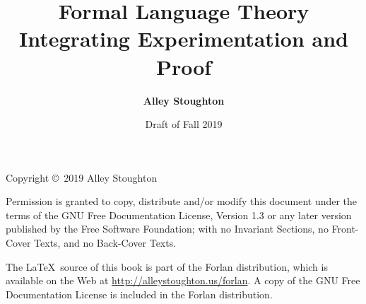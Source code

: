 \documentclass[11pt,twoside]{book}
\begin{document}

\title{\Huge\bf Formal Language Theory\\[.3cm]
\LARGE\bf Integrating Experimentation and Proof}

\author{\LARGE\bf Alley Stoughton}

\date{Draft of Fall 2019}

\titlepic{}

\maketitle

\thispagestyle{empty}

\noindent Copyright \copyright\ 2019 Alley Stoughton

\vspace{.5cm}
\noindent
Permission is granted to copy, distribute and/or modify this document
under the terms of the GNU Free Documentation License, Version 1.3 or
any later version published by the Free Software Foundation; with no
Invariant Sections, no Front-Cover Texts, and no Back-Cover Texts.

The \LaTeX\ source of this book is part of the Forlan distribution,
which is available on the Web at \url{http://alleystoughton.us/forlan}.  A
copy of the GNU Free Documentation License is included in the
Forlan distribution.

\clearemptydoublepage

\tableofcontents

\clearemptydoublepage

\listoffigures

\clearemptydoublepage






\clearemptydoublepage



\clearemptydoublepage



\clearemptydoublepage



\clearemptydoublepage



\clearemptydoublepage



\clearemptydoublepage







\clearemptydoublepage

{\small
\printindex}
\end{document}
